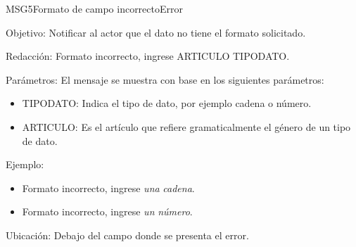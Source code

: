 \begin{mensaje}{MSG5}{Formato de campo incorrecto}{Error}
	\item [Objetivo:] Notificar al actor que el dato no tiene el formato solicitado.
	\item[Redacción:] Formato incorrecto, ingrese ARTICULO TIPODATO.
	\item[Parámetros:] El mensaje se muestra con base en los siguientes parámetros:
		\begin{itemize}
 			\item TIPODATO: Indica el tipo de dato, por ejemplo cadena o número.
 			\item ARTICULO: Es el artículo que refiere gramaticalmente el género de un tipo de dato.
		\end{itemize}
	\item[Ejemplo:] \begin{itemize}
		\item Formato incorrecto, ingrese {\em una} {\em cadena}.
		\item Formato incorrecto, ingrese {\em un} {\em número}.
	\end{itemize}
	\item [Ubicación:] Debajo del campo donde se presenta el error.
\end{mensaje}